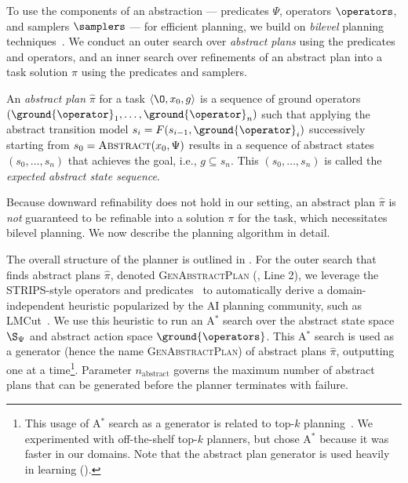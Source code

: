 To use the components of an abstraction --- predicates $\Psi$, operators $\operators$, and samplers $\samplers$ --- for efficient planning, we build on \emph{bilevel} planning techniques~\cite{srivastava2014combined,garrett2021integrated}. We conduct an outer search over \emph{abstract plans} using the predicates and operators, and an inner search over refinements of an abstract plan into a task solution $\pi$ using the predicates and samplers.

\begin{defn}
An \emph{abstract plan} $\hat{\pi}$ for a task $\langle \O, x_0, g \rangle$ is a sequence of ground operators $(\ground{\operator}_1, \ldots, \ground{\operator}_n)$ such that applying the abstract transition model $s_i = F(s_{i-1}, \ground{\operator}_i)$ successively starting from $s_0 = \textsc{Abstract}(x_0, \Psi)$ results in a sequence of abstract states $(s_0, \ldots, s_n)$ that achieves the goal, i.e., $g \subseteq s_n$. This $(s_0, \ldots, s_n)$ is called the \emph{expected abstract state sequence}.
\end{defn}

Because downward refinability does not hold in our setting, an abstract plan $\hat{\pi}$ is \emph{not} guaranteed to be refinable into a solution $\pi$ for the task, which necessitates bilevel planning. We now describe the planning algorithm in detail.

The overall structure of the planner is outlined in . For the outer search that finds abstract plans $\hat{\pi}$, denoted \textsc{GenAbstractPlan} (, Line 2), we leverage the STRIPS-style operators and predicates~\cite{fikes1971strips} to automatically derive a domain-independent heuristic popularized by the AI planning community, such as LMCut~\cite{helmert2009landmarks}. We use this heuristic to run an A$^*$ search over the abstract state space $\S_\Psi$ and abstract action space $\ground{\operators}$.
This A$^*$ search is used as a generator (hence the name \textsc{GenAbstractPlan}) of abstract plans $\hat{\pi}$, outputting one at a time\footnote{This usage of A$^*$ search as a generator is related to top-$k$ planning~\cite{katz-etal-icaps18,ren2021extended}. We experimented with off-the-shelf top-$k$ planners, but chose A$^*$ because it was faster in our domains. Note that the abstract plan generator is used heavily in learning ().}.
Parameter $n_{\text{abstract}}$ governs the maximum number of abstract plans that can be generated before the planner terminates with failure.

